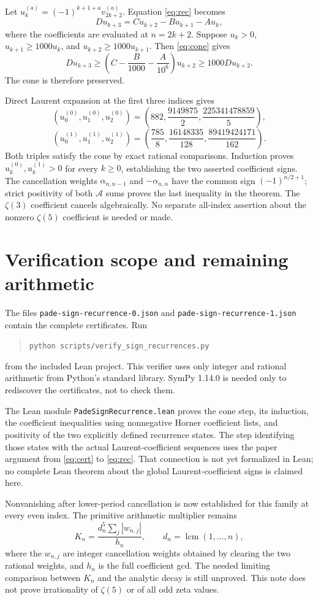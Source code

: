 \documentclass[11pt]{article}
\begin{document}
Let $u_k^{(a)}=(-1)^{k+1+a}v_{2k+2}^{(a)}$. Equation \eqref{eq:rec} becomes
\[
 D u_{k+3}=C u_{k+2}-B u_{k+1}-A u_k,
\]
where the coefficients are evaluated at $n=2k+2$. Suppose
$u_k>0$, $u_{k+1}\ge1000u_k$, and $u_{k+2}\ge1000u_{k+1}$.
Then \eqref{eq:cone} gives
\[
 D u_{k+3}\ge
 \left(C-\frac B{1000}-\frac A{10^6}\right)u_{k+2}
 \ge1000D u_{k+2}.
\]
The cone is therefore preserved.

Direct Laurent expansion at the first three indices gives
\[
 (u_0^{(0)},u_1^{(0)},u_2^{(0)})
 =\left(882,\frac{9149875}{2},\frac{225341478859}{5}\right),
\]
\[
 (u_0^{(1)},u_1^{(1)},u_2^{(1)})
 =\left(\frac{785}{8},\frac{16148335}{128},\frac{89419424171}{162}\right).
\]
Both triples satisfy the cone by exact rational comparisons.
Induction proves $u_k^{(0)},u_k^{(1)}>0$ for every $k\ge0$, establishing
the two asserted coefficient signs. The cancellation weights
$\alpha_{n,n-1}$ and $-\alpha_{n,n}$ have the common sign
$(-1)^{n/2+1}$; strict positivity of both $\mathcal A$ sums proves the
last inequality in the theorem. The $\zeta(3)$ coefficient cancels
algebraically. No separate all-index assertion about the nonzero
$\zeta(5)$ coefficient is needed or made.

\section{Verification scope and remaining arithmetic}
The files
\texttt{pade-sign-recurrence-0.json} and
\texttt{pade-sign-recurrence-1.json} contain the complete certificates.
Run
\begin{quote}
 \texttt{python scripts/verify\_sign\_recurrences.py}
\end{quote}
from the included Lean project. This verifier uses only integer and
rational arithmetic from Python's standard library. SymPy 1.14.0 is
needed only to rediscover the certificates, not to check them.

The Lean module \texttt{PadeSignRecurrence.lean} proves the cone step,
its induction, the coefficient inequalities using nonnegative Horner
coefficient lists, and positivity of the two explicitly defined recurrence
states. The step identifying those states with the actual Laurent-coefficient
sequences uses the paper argument from \eqref{eq:cert} to \eqref{eq:rec}.
That connection is not yet formalized in Lean; no complete Lean theorem
about the global Laurent-coefficient signs is claimed here.

Nonvanishing after lower-period cancellation is now established for this
family at every even index. The primitive arithmetic multiplier remains
\[
 K_n=\frac{d_n^5\sum_j|w_{n,j}|}{h_n},
 \qquad d_n=\operatorname{lcm}(1,\ldots,n),
\]
where the $w_{n,j}$ are integer cancellation weights obtained by clearing
the two rational weights, and $h_n$ is the full coefficient gcd.
The needed limiting comparison
between $K_n$ and the analytic decay is still unproved.
This note does not prove irrationality of $\zeta(5)$ or of all odd zeta values.
\end{document}
